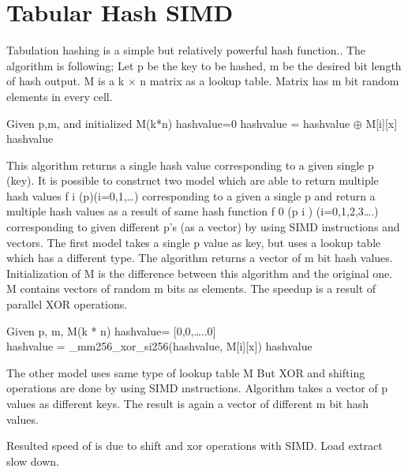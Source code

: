 \documentclass[11pt,oneside,a4paper]{article}
\begin{document}
\section{Tabular Hash SIMD}
Tabulation hashing is a simple but relatively powerful hash function.. The algorithm is
following;
Let p be the key to be hashed, m be the desired bit length of hash output. M is a k × n
matrix as a lookup table. Matrix has m bit random elements in every cell.
\begin{algorithm}
\begin{algorithmic}
\State Given p,m, and initialized M(k*n)
\State hashvalue=0
\State hashvalue = hashvalue  $\oplus$ M[i][x]
\EndFor
\Return hashvalue

\EndFunction
\end{algorithmic}
\end{algorithm}
This algorithm returns a single hash value corresponding to a given single p
(key). It is possible to construct two model which are able to return multiple hash
values f i (p)(i=0,1,…) corresponding to a given a single p and return a multiple
hash values as a result of same hash function f 0 (p i ) (i=0,1,2,3….) corresponding
to given different p’s (as a vector) by using SIMD instructions and vectors.
The first model takes a single p value as key, but uses a lookup table which has a
different type. The algorithm returns a vector of m bit hash values. Initialization of
M is the difference between this algorithm and the original one. M contains
vectors of random m bits as elements. The speedup is a result of parallel XOR
operations.
\begin{algorithm}[H]
\begin{algorithmic}
\State Given p, m, M(k * n)
\State  hashvalue= [0,0,…..0]
\\
hashvalue = \_mm256\_xor\_si256(hashvalue, M[i][x]) 
\EndFor
\Return hashvalue
\EndFunction
\end{algorithmic}
\end{algorithm}
The other model uses same type of lookup table M But XOR and shifting
operations are done by using SIMD ınstructions. Algorithm takes a vector of p
values as different keys. The result is again a vector of different m bit hash
values.

Resulted speed of is due to shift and xor operations with SIMD. Load extract slow
down.
\end{document}

